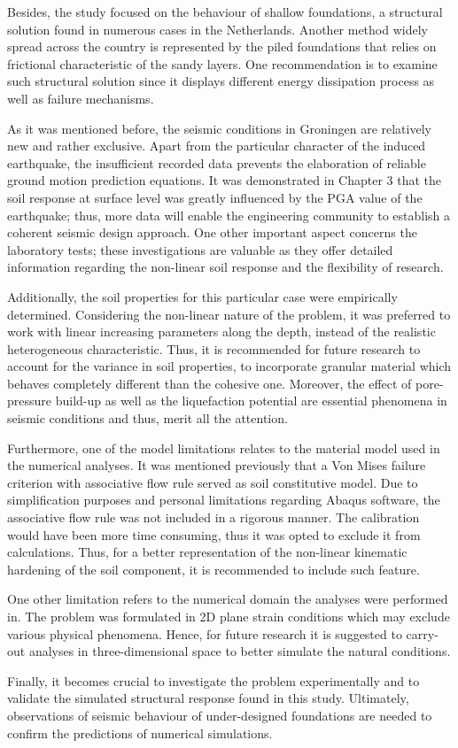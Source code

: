 Besides, the study focused on the behaviour of shallow foundations, a structural solution found in numerous cases in the Netherlands. Another  method widely spread across the country is represented by the piled foundations that relies on frictional characteristic of  the sandy layers. One recommendation is to examine such structural solution since it displays different energy dissipation process as well as failure mechanisms.

As it was mentioned before, the seismic conditions in Groningen are relatively new and rather exclusive. Apart from the particular character of the induced earthquake, the insufficient recorded data prevents the elaboration of reliable ground motion prediction equations. It was demonstrated in Chapter 3 that the soil response at surface level was greatly influenced by the PGA value of the earthquake; thus, more data will enable the engineering community to establish a coherent seismic design approach. One other important aspect concerns the laboratory tests; these investigations are valuable as they offer detailed information regarding the non-linear soil response and the flexibility of research.

Additionally, the soil properties for this particular case were empirically determined. Considering the non-linear nature of the problem, it was preferred to work with linear increasing parameters along the depth, instead of the realistic heterogeneous characteristic. Thus, it is recommended for future research to account for the variance in soil properties, to incorporate granular material which behaves completely different than the cohesive one. Moreover, the effect of pore-pressure build-up as well as the liquefaction potential are essential phenomena in seismic conditions and thus, merit all the attention.

Furthermore, one of the model limitations relates to the material model used in the numerical analyses. It was mentioned previously that a Von Mises failure criterion with associative flow rule served as soil constitutive model. Due to simplification purposes and personal limitations regarding Abaqus software, the associative flow rule was not included in a rigorous manner. The calibration would have been more time consuming, thus it was opted to exclude it from calculations. Thus, for a better representation of the non-linear kinematic hardening of the soil component, it is recommended to include such feature.

One other limitation refers to the numerical domain the analyses were performed in. The problem was formulated in 2D plane strain conditions which may exclude various physical \mbox{phenomena}. Hence, for future research it is suggested to carry-out analyses in three-dimensional space to better simulate the natural conditions. 

Finally, it becomes crucial to investigate the problem experimentally and to validate the simulated structural response found in this study. Ultimately, observations of seismic behaviour of under-designed foundations are needed to confirm the predictions of numerical simulations.


